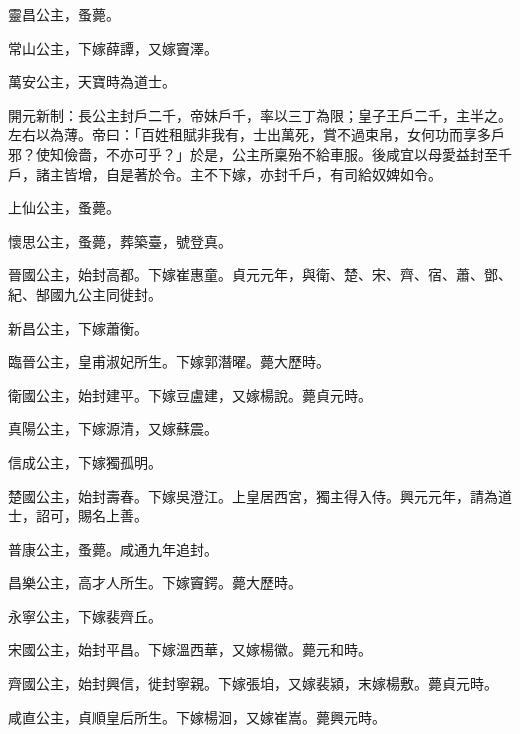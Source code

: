\begin{pinyinscope}
 靈昌公主，蚤薨。



 常山公主，下嫁薛譚，又嫁竇澤。



 萬安公主，天寶時為道士。



 開元新制：長公主封戶二千，帝妹戶千，率以三丁為限；皇子王戶二千，主半之。左右以為薄。帝曰：「百姓租賦非我有，士出萬死，賞不過束帛，女何功而享多戶邪？使知儉嗇，不亦可乎？」於是，公主所稟殆不給車服。後咸宜以母愛益封至千戶，諸主皆增，自是著於令。主不下嫁，亦封千戶，有司給奴婢如令。



 上仙公主，蚤薨。



 懷思公主，蚤薨，葬築臺，號登真。



 晉國公主，始封高都。下嫁崔惠童。貞元元年，與衛、楚、宋、齊、宿、蕭、鄧、紀、郜國九公主同徙封。



 新昌公主，下嫁蕭衡。



 臨晉公主，皇甫淑妃所生。下嫁郭潛曜。薨大歷時。



 衛國公主，始封建平。下嫁豆盧建，又嫁楊說。薨貞元時。



 真陽公主，下嫁源清，又嫁蘇震。



 信成公主，下嫁獨孤明。



 楚國公主，始封壽春。下嫁吳澄江。上皇居西宮，獨主得入侍。興元元年，請為道士，詔可，賜名上善。



 普康公主，蚤薨。咸通九年追封。



 昌樂公主，高才人所生。下嫁竇鍔。薨大歷時。



 永寧公主，下嫁裴齊丘。



 宋國公主，始封平昌。下嫁溫西華，又嫁楊徽。薨元和時。



 齊國公主，始封興信，徙封寧親。下嫁張垍，又嫁裴潁，末嫁楊敷。薨貞元時。



 咸直公主，貞順皇后所生。下嫁楊洄，又嫁崔嵩。薨興元時。




\end{pinyinscope}
